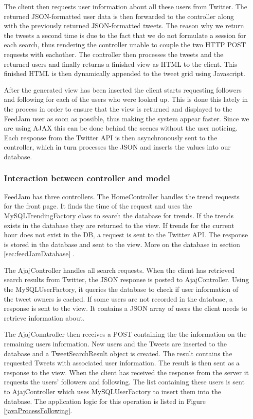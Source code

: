 The client then requests user information about all these users from Twitter. The returned JSON-formatted user data is then forwarded to the controller along with the previously returned JSON-formatted tweets. The reason why we return the tweets a second time is due to the fact that we do not formulate a session for each search, thus rendering the controller unable to couple the two HTTP POST requests with eachother. The controller then processes the tweets and the returned users and finally returns a finished view as HTML to the client. This finished HTML is then dynamically appended to the tweet grid using Javascript.

After the generated view has been inserted the client starts requesting followers and following for each of the users who were looked up. This is done this lately in the process in order to ensure that the view is returned and displayed to the FeedJam user as soon as possible, thus making the system appear faster. Since we are using AJAX this can be done behind the scenes without the user noticing. Each response from the Twitter API is then asynchronously sent to the controller, which in turn processes the JSON and inserts the values into our database.

\subsubsection{Interaction between controller and model} %
\label{modelControllerInteraction}
FeedJam has three controllers. The HomeController handles the trend requests for the front page. It finds the time of the request and uses the MySQLTrendingFactory class to search the database for trends. If the trends exists in the database they are returned to the view. If trends for the current hour does not exist in the DB, a request is sent to the  Twitter API. The response is stored in the database and sent to the view. More on the database in section \ref{sec:feedJamDatabase} .

The AjajController handles all search requests. When the client has retrieved search results from Twitter, the JSON response is posted to AjajController. Using the MySQLUserFactory, it queries the database to check if user information of the tweet owners is cached. If some users are not recorded in the database, a response is sent to the view. It contains a JSON array of users the client needs to retrieve information about. 

The AjajConntroller then receives a POST containing the the information on the remaining users information. New users and the Tweets are inserted to the database and a TweetSearchResult object is created. The result contains the requested Tweets with associated user information. The result is then sent as a response to the view. When the client has received the response from the server it requests the users' followers and following. The list containing these users is sent to AjajController which uses MySQLUserFactory to insert them into the database. The application logic for this operation is listed in Figure \ref{javaProcessFollowing}.

